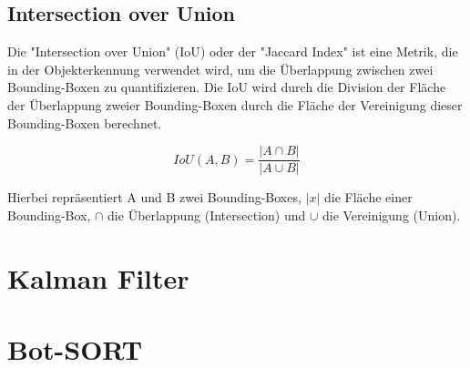    \subsection{Intersection over Union}
    Die "Intersection over Union" (\acs{IoU}) oder der "Jaccard Index" ist eine Metrik, die in der Objekterkennung verwendet wird, um die Überlappung zwischen zwei Bounding-Boxen zu quantifizieren. Die \acs{IoU} wird durch die Division der Fläche der Überlappung zweier Bounding-Boxen durch die Fläche der Vereinigung dieser Bounding-Boxen berechnet. 

    \begin{equation}
        IoU(A, B) = \frac{|A \cap B|}{|A \cup B|}
    \end{equation}

    Hierbei repräsentiert A und B zwei Bounding-Boxes, $|x|$ die Fläche einer Bounding-Box, $\cap$ die Überlappung (Intersection) und $\cup$ die Vereinigung (Union).
\section{Kalman Filter}

\section{Bot-SORT}